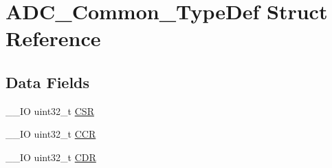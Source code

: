 \hypertarget{struct_a_d_c___common___type_def}{\section{A\-D\-C\-\_\-\-Common\-\_\-\-Type\-Def Struct Reference}
\label{struct_a_d_c___common___type_def}
}
\subsection*{Data Fields}
\begin{DoxyCompactItemize}
\item 
\-\_\-\-\_\-\-I\-O uint32\-\_\-t \hyperlink{struct_a_d_c___common___type_def_a876dd0a8546697065f406b7543e27af2}{C\-S\-R}
\item 
\-\_\-\-\_\-\-I\-O uint32\-\_\-t \hyperlink{struct_a_d_c___common___type_def_a5e1322e27c40bf91d172f9673f205c97}{C\-C\-R}
\item 
\-\_\-\-\_\-\-I\-O uint32\-\_\-t \hyperlink{struct_a_d_c___common___type_def_a760f86a1a18dffffda54fc15a977979f}{C\-D\-R}
\end{DoxyCompactItemize}


